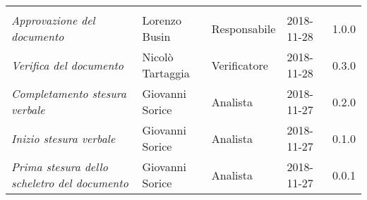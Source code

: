 \newpage 
\section*{}
\begin{table}[H]
	\centering
	\begin{tabular}{p{4cm}|C{3cm}|C{3cm}|R{2.5cm}|R{2cm}}
		
		 & & & & \\
		
		
		\emph{Approvazione del documento} & Lorenzo Busin & Responsabile & 2018-11-28 & 1.0.0 \\
		\hline
		
		\emph{Verifica del documento} & Nicolò Tartaggia & Verificatore & 2018-11-28 & 0.3.0 \\
		\hline

		\emph{Completamento stesura verbale} & Giovanni Sorice & Analista & 2018-11-27 & 0.2.0 \\
		\hline

		\emph{Inizio stesura verbale} & Giovanni Sorice & Analista & 2018-11-27 & 0.1.0 \\
		\hline
		
		\emph{Prima stesura dello scheletro del documento} & Giovanni Sorice & Analista & 2018-11-27 & 0.0.1 \\
		
	\end{tabular}
	
\end{table}


\clearpage